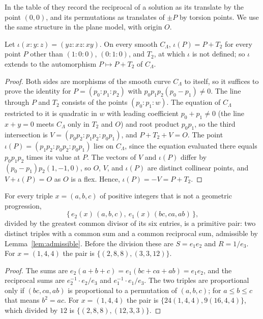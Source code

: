 \documentclass[10pt]{article}
\begin{document}
In the table of \cite[\S4, p.~120]{bgn1993} they record the reciprocal of a solution as its translate by the point $(0,0)$, and its permutations as translates of $\pm P$ by torsion points. We use the same structure in the plane model, with origin $O$.

\begin{proposition}\label{prop:dual}
Let $\iota(x:y:z)=(yz:xz:xy)$. On every smooth $C_\Lambda$, $\iota(P)=P+T_2$ for every point $P$ other than $(1:0:0)$, $(0:1:0)$, and $T_2$, at which $\iota$ is not defined; so $\iota$ extends to the automorphism $P\mapsto P+T_2$ of $C_\Lambda$.
\end{proposition}

\begin{proof}
Both sides are morphisms of the smooth curve $C_\Lambda$ to itself, so it suffices to prove the identity for $P=(p_0:p_1:p_2)$ with $p_0p_1p_2(p_0-p_1)\ne0$. The line through $P$ and $T_2$ consists of the points $(p_0:p_1:w)$. The equation of $C_\Lambda$ restricted to it is quadratic in $w$ with leading coefficient $p_0+p_1\ne0$ (the line $x+y=0$ meets $C_\Lambda$ only in $T_2$ and $O$) and root product $p_0p_1$, so the third intersection is $V=(p_0p_2:p_1p_2:p_0p_1)$, and $P+T_2+V=O$. The point $\iota(P)=(p_1p_2:p_0p_2:p_0p_1)$ lies on $C_\Lambda$, since the equation evaluated there equals $p_0p_1p_2$ times its value at $P$. The vectors of $V$ and $\iota(P)$ differ by $(p_0-p_1)p_2(1,-1,0)$, so $O$, $V$, and $\iota(P)$ are distinct collinear points, and $V+\iota(P)=O$ as $O$ is a flex. Hence, $\iota(P)=-V=P+T_2$.
\end{proof}

\begin{corollary}\label{cor:dual}
For every triple $x=(a,b,c)$ of positive integers that is not a geometric progression,
\[
  \big\{\,e_2(x)\,(a,b,c),\ e_1(x)\,(bc,ca,ab)\,\big\},
\]
divided by the greatest common divisor of its six entries, is a primitive pair: two distinct triples with a common sum and a common reciprocal sum, admissible by Lemma~\ref{lem:admissible}. Before the division these are $S=e_1e_2$ and $R=1/e_3$. For $x=(1,4,4)$ the pair is $\{(2,8,8),(3,3,12)\}$.
\end{corollary}

\begin{proof}
The sums are $e_2(a+b+c)=e_1(bc+ca+ab)=e_1e_2$, and the reciprocal sums are $e_2^{-1}\cdot e_2/e_3$ and $e_1^{-1}\cdot e_1/e_3$. The two triples are proportional only if $(bc,ca,ab)$ is proportional to a permutation of $(a,b,c)$; for $a\le b\le c$ that means $b^2=ac$. For $x=(1,4,4)$ the pair is $\{24(1,4,4),9(16,4,4)\}$, which divided by $12$ is $\{(2,8,8),(12,3,3)\}$.
\end{proof}
\end{document}
